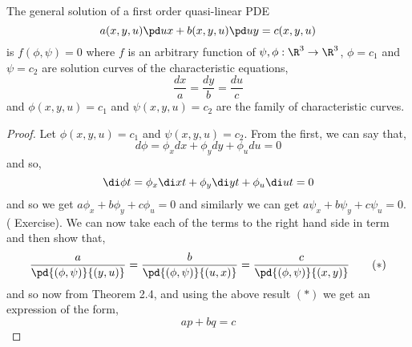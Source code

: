 \begin{nthm}
  The general solution of a first order quasi-linear PDE
  $$ a(x, y, u)\pd u x + b(x, y, u)\pd u y = c(x, y, u) $$
  is $f(\phi, \psi) = 0$ where $f$ is an arbitrary function of $\psi, \phi : \R^3 \to \R^3$, $\phi = c_1$ and $\psi = c_2$ are solution curves of the characteristic equations,
  $$ \frac{dx}{a} = \frac{dy}{b} = \frac{du}{c} $$
  and $\phi(x, y, u) = c_1$ and $\psi(x, y, u) = c_2$ are the family of characteristic curves.
\end{nthm}
\begin{proof}
  Let $\phi(x, y, u) = c_1$ and $\psi(x, y, u) = c_2$. From the first, we can say that,
  $$ d\phi = \phi_x dx + \phi_ydy + \phi_udu = 0 $$
  and so,
  $$ \di \phi t = \phi_x \di x t + \phi_y \di y t + \phi_u\di u t = 0 $$
  and so we get $a\phi_x + b\phi_y + c\phi_u = 0$ and similarly we can get $a\psi_x + b\psi_y + c\psi_u = 0$. ({\color{red} Exercise}). We can now take each of the terms to the right hand side in term and then show that,
  \begin{equation}
    \frac{a}{\pd{(\phi, \psi)}{(y, u)}} = \frac{b}{\pd{(\phi, \psi)}{(u, x)}} = \frac{c}{\pd{(\phi, \psi)}{(x, y)}} \tag{$*$}
  \end{equation}
  and so now from Theorem 2.4, and using the above result $(*)$ we get an expression of the form,
  $$ ap + bq = c $$
\end{proof}